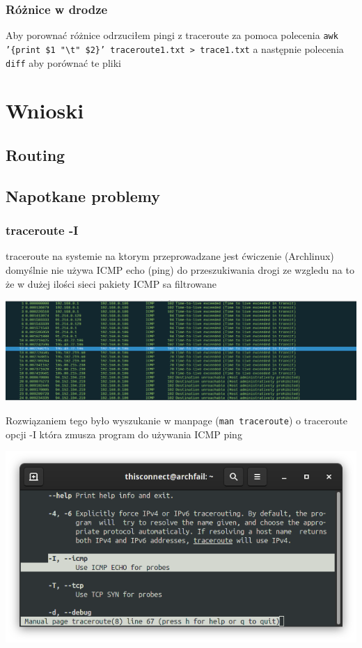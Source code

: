 \documentclass[11pt]{article}
\begin{document}
\subsubsection{Różnice w drodze}
\label{sec:orge16e29b}
Aby porownać różnice odrzuciłem pingi z traceroute za pomoca polecenia \texttt{awk '\{print \$1 "\textbackslash{}t" \$2\}' traceroute1.txt > trace1.txt} a następnie polecenia \texttt{diff} aby porównać te pliki


\section{Wnioski}
\label{sec:orgf6a5a47}
\subsection{Routing}
\label{sec:org28ab8b1}
\subsection{Napotkane problemy}
\label{sec:org7795f32}
\subsubsection{traceroute -I}
\label{sec:org935efc4}
traceroute na systemie na ktorym przeprowadzane jest ćwiczenie (Archlinux) domyślnie nie używa ICMP echo (ping) do przeszukiwania drogi ze wzgledu na to że w dużej ilości sieci pakiety ICMP sa filtrowane
\begin{center}
\includegraphics[width=.9\linewidth]{./problemy/problem1.png}
\end{center}

Rozwiązaniem tego było wyszukanie w manpage (\texttt{man traceroute}) o traceroute opcji -I która zmusza program do używania ICMP ping
\begin{center}
\includegraphics[width=.9\linewidth]{./problemy/rozwiazanie1.png}
\end{center}
\end{document}
